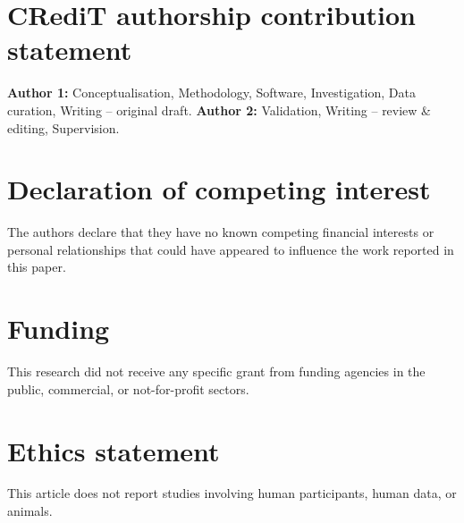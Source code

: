
\section*{CRediT authorship contribution statement}
\textbf{Author 1:} Conceptualisation, Methodology, Software, Investigation,
Data curation, Writing -- original draft. \textbf{Author 2:} Validation,
Writing -- review \& editing, Supervision. %

\section*{Declaration of competing interest}
The authors declare that they have no known competing financial interests
or personal relationships that could have appeared to influence the work
reported in this paper.

\section*{Funding}
This research did not receive any specific grant from funding agencies in
the public, commercial, or not-for-profit sectors. %

\section*{Ethics statement}
This article does not report studies involving human participants, human
data, or animals.

